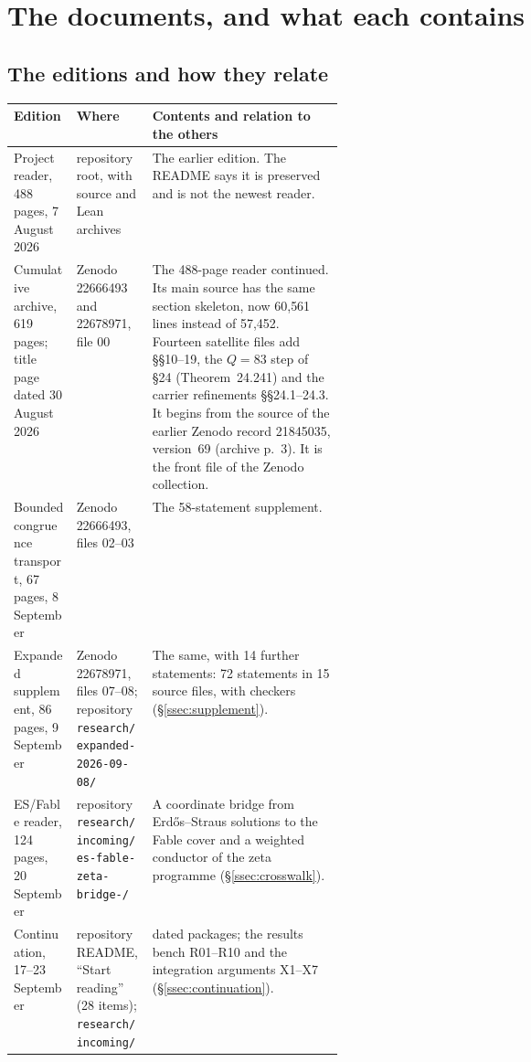 \section{The documents, and what each contains}\label{sec:corpus}

\subsection{The editions and how they relate}

\begin{center}\small
\begin{tabularx}{\linewidth}{@{}>{\raggedright\arraybackslash}p{0.19\linewidth}>{\raggedright\arraybackslash}p{0.23\linewidth}>{\raggedright\arraybackslash}X@{}}
\toprule
Edition & Where & Contents and relation to the others\\
\midrule
Project reader, 488 pages, 7 August 2026 & repository root, with source and Lean archives & The earlier edition. The README says it is preserved and is not the newest reader.\\
Cumulative archive, 619 pages; title page dated 30 August 2026 & Zenodo 22666493 and 22678971, file 00 & The 488-page reader continued. Its main source has the same section skeleton, now 60{,}561 lines instead of 57{,}452. Fourteen satellite files add §§10--19, the $Q=83$ step of §24 (Theorem~24.241) and the carrier refinements §§24.1--24.3. It begins from the source of the earlier Zenodo record 21845035, version~69 (archive p.~3). It is the front file of the Zenodo collection.\\
Bounded congruence transport, 67 pages, 8 September & Zenodo 22666493, files 02--03 & The 58-statement supplement.\\
Expanded supplement, 86 pages, 9 September & Zenodo 22678971, files 07--08; repository \texttt{research/\allowbreak expanded-2026-09-08/} & The same, with 14 further statements: 72 statements in 15 source files, with checkers (§\ref{ssec:supplement}).\\
ES/Fable reader, 124 pages, 20 September & repository \texttt{research/\allowbreak incoming/\allowbreak es-fable-zeta-bridge-\allowbreak 20260920/} & A coordinate bridge from Erdős--Straus solutions to the Fable cover and a weighted conductor of the zeta programme (§\ref{ssec:crosswalk}).\\
Continuation, 17--23 September & repository README, ``Start reading'' (28 items); \texttt{research/\allowbreak incoming/} & 41 dated packages; the results bench R01--R10 and the integration arguments X1--X7 (§\ref{ssec:continuation}).\\
\bottomrule
\end{tabularx}
\end{center}


